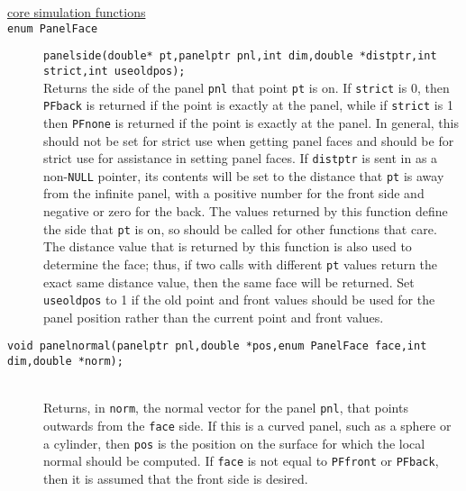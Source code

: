 \documentclass {book}
\begin{document}
\begin{description}
\item[\underline{core simulation functions}]

\item[\texttt{enum PanelFace}]
\texttt{panelside(double* pt,panelptr pnl,int dim,double *distptr,int strict,int useoldpos);}
\hfill \\
Returns the side of the panel \texttt{pnl} that point \texttt{pt} is on.  If \texttt{strict} is 0, then \texttt{PFback} is returned if the point is exactly at the panel, while if \texttt{strict} is 1 then \texttt{PFnone} is returned if the point is exactly at the panel.  In general, this should not be set for strict use when getting panel faces and should be for strict use for assistance in setting panel faces.  If \texttt{distptr} is sent in as a non-\texttt{NULL} pointer, its contents will be set to the distance that \texttt{pt} is away from the infinite panel, with a positive number for the front side and negative or zero for the back.  The values returned by this function define the side that \texttt{pt} is on, so should be called for other functions that care.  The distance value that is returned by this function is also used to determine the face; thus, if two calls with different \texttt{pt} values return the exact same distance value, then the same face will be returned.  Set \texttt{useoldpos} to 1 if the old point and front values should be used for the panel position rather than the current point and front values.

\item[\texttt{void panelnormal(panelptr pnl,double *pos,enum PanelFace face,int dim,double *norm);}]
\hfill \\
Returns, in \texttt{norm}, the normal vector for the panel \texttt{pnl}, that points outwards from the \texttt{face} side.  If this is a curved panel, such as a sphere or a cylinder, then \texttt{pos} is the position on the surface for which the local normal should be computed.  If \texttt{face} is not equal to \texttt{PFfront} or \texttt{PFback}, then it is assumed that the front side is desired.


\end{description}
\end{document}

